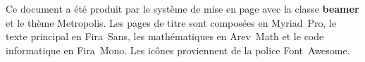 
\begin{frame}[plain]
  \begin{adjustwidth}{20mm}{20mm}
    \scriptsize \raggedright %
    Ce document a été produit par le système de mise en page
    {\XeLaTeX} avec la classe \textbf{beamer} et le thème Metropolis.
    Les pages de titre sont composées en Myriad~Pro, le texte
    principal en Fira~Sans, les mathématiques en Arev~Math et le code
    informatique en Fira~Mono. Les icônes proviennent de la police
    Font~Awesome.
  \end{adjustwidth}
\end{frame}

